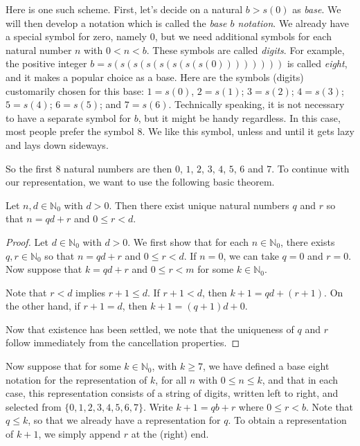 Here is one such scheme.  First, let's
decide on a natural $b>s(0)$ as \textit{base}.  We will
then develop a notation which is called the \textit{base $b$
notation}.  We already have a special symbol for zero, namely $0$,
but we need additional symbols for each natural number $n$ with
$0<n<b$. These symbols
are called \textit{digits}.  For example,
the positive integer $b=s(s(s(s(s(s(s(s(0))))))))$ is called 
\textit{eight}, and it makes a popular choice as a base.
Here are the symbols (digits) customarily chosen for this base: 
$1=s(0)$, $2=s(1)$;
$3=s(2)$; $4=s(3)$; $5=s(4)$; $6=s(5)$; and $7=s(6)$.  Technically
speaking, it is not necessary to have a separate symbol for
$b$, but it might be handy regardless. In this case, most
people prefer the symbol $8$.  We like this symbol, unless and until
it gets lazy and lays down sideways.

So the first $8$ natural numbers are then $0$, $1$, $2$, $3$, $4$,
$5$, $6$ and $7$.  To continue with our representation, we want 
to use the following basic theorem.

\begin{theorem}
Let $n,d\in \mathbb{N}_0$ with $d>0$.  Then there exist unique natural
numbers $q$ and $r$ so that $n=qd+r$ and $0\le r < d$.
\end{theorem}

\begin{proof}
Let $d\in \mathbb{N}_0$ with $d>0$.  We first show that for each 
$n\in\mathbb{N}_0$, there exists $q,r\in\mathbb{N}_0$ so that
$n=qd+r$ and $0\le r<d$.  If $n=0$, we can take
$q=0$ and $r=0$.  Now suppose that $k=qd+r$ and $0\le r<m$ for 
some $k\in \mathbb{N}_0$.

Note that $r<d$ implies $r+1\le d$.
If $r+1<d$, then $k+1=qd+(r+1)$. On the other hand, if
$r+1=d$, then $k+1=(q+1)d+0$.

Now that existence has been settled, we note that the uniqueness 
of $q$ and $r$ follow immediately from the cancellation properties.
\end{proof}

Now suppose that for some $k\in \mathbb{N}_0$, with
$k\ge 7$, we have defined a base eight notation for the representation
of $k$, for all $n$ with $0\le n\le k$, and that in each case, 
this representation consists of a string of digits,
written left to right, and selected from $\{0,1,2,3,4,5,6,7\}$.
Write $k+1=qb+r$ where $0\le r<b$.  Note that $q\le k$, so that
we already have a representation for $q$.  To obtain a representation
of $k+1$, we simply append $r$ at the (right) end.  

